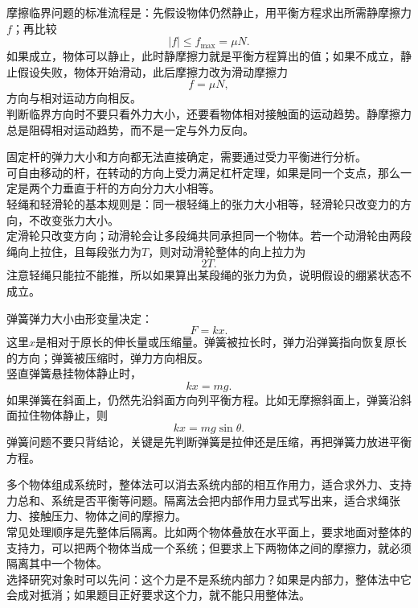 \begin{casetypebox}[title={\strut\textcolor{white}{\bfseries 常见题型：摩擦临界问题}}]
  摩擦临界问题的标准流程是：先假设物体仍然静止，用平衡方程求出所需静摩擦力$f$；再比较
  \[
    |f|\leq f_{\max}=\mu N.
  \]
  如果成立，物体可以静止，此时静摩擦力就是平衡方程算出的值；如果不成立，静止假设失败，物体开始滑动，此后摩擦力改为滑动摩擦力
  \[
    f=\mu N,
  \]
  方向与相对运动方向相反。\\
  判断临界方向时不要只看外力大小，还要看物体相对接触面的运动趋势。静摩擦力总是阻碍相对运动趋势，而不是一定与外力反向。
\end{casetypebox}

\begin{casetypebox}[title={\strut\textcolor{white}{\bfseries 常见题型：绳与滑轮}}]
固定杆的弹力大小和方向都无法直接确定，需要通过受力平衡进行分析。\\
可自由移动的杆，在转动的方向上受力满足杠杆定理，如果是同一个支点，那么一定是两个力垂直于杆的方向分力大小相等。\\
  轻绳和轻滑轮的基本规则是：同一根轻绳上的张力大小相等，轻滑轮只改变力的方向，不改变张力大小。\\
  定滑轮只改变方向；动滑轮会让多段绳共同承担同一个物体。若一个动滑轮由两段绳向上拉住，且每段张力为$T$，则对动滑轮整体的向上拉力为
  \[
    2T.
  \]
  注意轻绳只能拉不能推，所以如果算出某段绳的张力为负，说明假设的绷紧状态不成立。
\end{casetypebox}

\begin{casetypebox}[title={\strut\textcolor{white}{\bfseries 常见题型：弹簧平衡}}]
  弹簧弹力大小由形变量决定：
  \[
    F=kx.
  \]
  这里$x$是相对于原长的伸长量或压缩量。弹簧被拉长时，弹力沿弹簧指向恢复原长的方向；弹簧被压缩时，弹力方向相反。\\
  竖直弹簧悬挂物体静止时，
  \[
    kx=mg.
  \]
  如果弹簧在斜面上，仍然先沿斜面方向列平衡方程。比如无摩擦斜面上，弹簧沿斜面拉住物体静止，则
  \[
    kx=mg\sin\theta.
  \]
  弹簧问题不要只背结论，关键是先判断弹簧是拉伸还是压缩，再把弹簧力放进平衡方程。
\end{casetypebox}

\begin{casetypebox}[title={\strut\textcolor{white}{\bfseries 常见题型：整体法与隔离法}}]
  多个物体组成系统时，整体法可以消去系统内部的相互作用力，适合求外力、支持力总和、系统是否平衡等问题。隔离法会把内部作用力显式写出来，适合求绳张力、接触压力、物体之间的摩擦力。\\
  常见处理顺序是先整体后隔离。比如两个物体叠放在水平面上，要求地面对整体的支持力，可以把两个物体当成一个系统；但要求上下两物体之间的摩擦力，就必须隔离其中一个物体。\\
  选择研究对象时可以先问：这个力是不是系统内部力？如果是内部力，整体法中它会成对抵消；如果题目正好要求这个力，就不能只用整体法。
\end{casetypebox}

